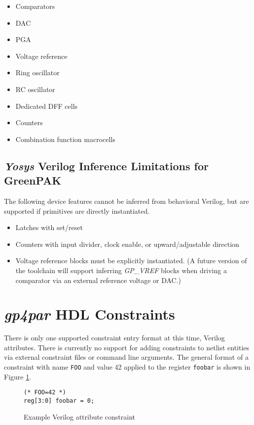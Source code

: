 \documentclass[11pt]{article}
\newcommand{\namestyle}[1]{\textit{#1}}
\newcommand{\tokenstyle}[1]{\texttt{#1}}
\newcommand{\wirestyle}[1]{\texttt{#1}}
\begin{document}
\begin{itemize}
\item Comparators
\item DAC
\item PGA
\item Voltage reference
\item Ring oscillator
\item RC oscillator
\item Dedicated DFF cells
\item Counters
\item Combination function macrocells
\end{itemize}

\subsection{\namestyle{Yosys} Verilog Inference Limitations for GreenPAK}

The following device features cannot be inferred from behavioral Verilog, but are supported if primitives are directly
instantiated.

\begin{itemize}
\item Latches with set/reset
\item Counters with input divider, clock enable, or upward/adjustable direction
\item Voltage reference blocks must be explicitly instantiated. (A future version of the toolchain will support inferring
\namestyle{GP\_VREF} blocks when driving a comparator via an external reference voltage or DAC.)
\end{itemize}

\pagebreak
\section{\namestyle{gp4par} HDL Constraints}

There is only one supported constraint entry format at this time, Verilog attributes. There is currently no support for
adding constraints to netlist entities via external constraint files or command line arguments. The general format of a
constraint with name \tokenstyle{FOO} and value 42 applied to the register \wirestyle{foobar} is shown in Figure
\ref{constraint}.

\begin{figure}[h]
\begin{lstlisting}
(* FOO=42 *)
reg[3:0] foobar = 0;
\end{lstlisting}
\caption{Example Verilog attribute constraint}
\label{constraint}
\end{figure}
\end{document}

